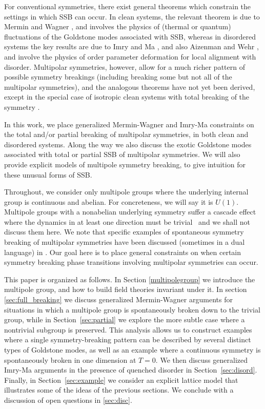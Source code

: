 \documentclass[pra,aps,twocolumn, amsfonts,amsmath,amssymb,nofootinbib,superscriptaddress]{revtex4-2}
\begin{document}
For conventional symmetries, there exist general theorems which constrain the settings in which SSB can occur. In clean systems, the relevant theorem is due to Mermin and Wagner \cite{MerminWagner}, and involves the physics of (thermal or quantum) fluctuations of the Goldstone modes associated with SSB, whereas in disordered systems the key results are due to Imry and Ma \cite{ImryMa, Vojta2013}, and also Aizenman and Wehr \cite{Aizenman}, and involve the physics of order parameter deformation for local alignment with disorder. Multipolar symmetries, however, allow for a much richer pattern of possible symmetry breakings (including breaking some but not all of the multipolar symmetries), and the analogous theorems have not yet been derived, except in the special case of isotropic clean systems with total breaking of the symmetry \cite{Griffin2013Multi}.

In this work, we place generalized Mermin-Wagner and Imry-Ma constraints on the total and/or partial breaking of multipolar symmetries, in both clean and disordered systems. Along the way we also discuss the exotic Goldstone modes associated with total or partial SSB of multipolar symmetries. We will also provide explicit models of multipole symmetry breaking, to give intuition for these unusual forms of SSB. 

Throughout, we consider only multipole groups where the underlying internal group is continuous and abelian. For concreteness, we will say it is $U(1)$. Multipole groups with a nonabelian underlying symmetry suffer a cascade effect where the dynamics in at least one direction must be trivial~\cite{nonabelian} and we shall not discuss them here. We note that specific examples of spontaneous symmetry breaking of multipolar symmetries have been discussed (sometimes in a dual language) in \cite{elastic1, elastic2, elastic3, elastic4, elastic5, FS1, FS2}. Our goal here is to place general constraints on when certain symmetry breaking phase transitions involving multipolar symmetries can occur. 

This paper is organized as follows. In Section \ref{multipolegroup} we introduce the multipole group, and how to build field theories invariant under it. In section \ref{sec:full_breaking} we discuss generalized Mermin-Wagner arguments for situations in which a multipole group is spontaneously broken down to the trivial group, while in Section~\ref{sec:partial} we explore the more subtle case where a nontrivial subgroup is preserved. This analysis allows us to construct examples where a single symmetry-breaking pattern can be described by several distinct types of Goldstone modes, as well as an example where a continuous symmetry is spontaneously broken in one dimension at $T=0$. 
We then discuss generalized Imry-Ma arguments in the presence of quenched disorder in Section~\ref{sec:disord}. Finally, in Section~\ref{sec:example} we consider an explicit lattice model that illustrates some of the ideas of the previous sections. We conclude with a discussion of open questions in \ref{sec:disc}.
\end{document}
